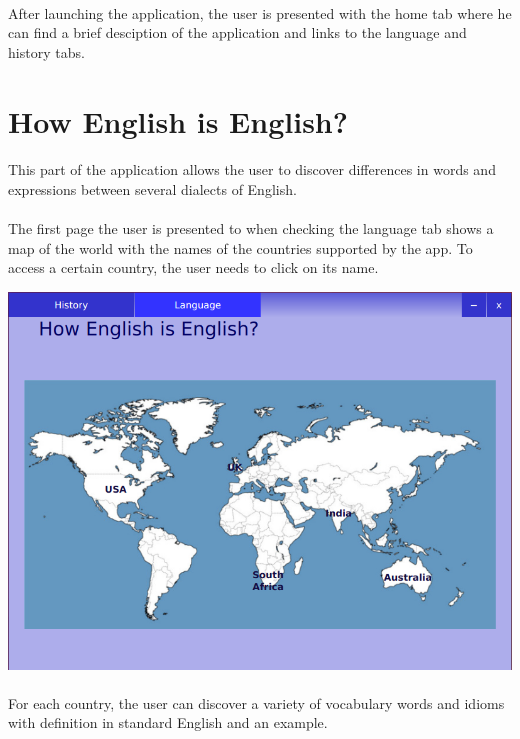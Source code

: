 \documentclass[11pt, a4paper]{report}
\begin{document}
\paragraph{}After launching the application, the user is presented with the home tab where he can find a brief desciption of the application and links to the language and history tabs.


\section*{How English is English?}
\paragraph{}This part of the application allows the user to discover differences in words and expressions between several dialects of English.

\paragraph{}The first page the user is presented to when checking the language tab shows a map of the world with the names of the countries supported by the app. To access a certain country, the user needs to click on its name.

\vspace{0.15cm}
\centerline{\includegraphics[scale=0.5]{images/languageTab.png}}

\paragraph{}For each country, the user can discover a variety of vocabulary words and idioms with definition in standard English and an example. 
\end{document}
